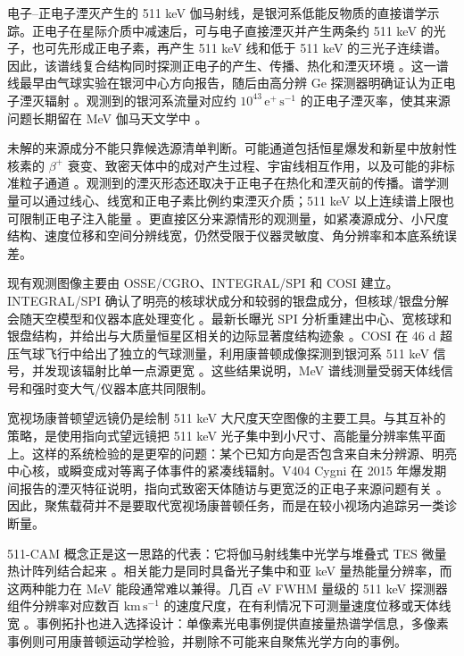 \documentclass[preprint,12pt]{elsarticle}
\begin{document}
电子--正电子湮灭产生的 511 keV 伽马射线，是银河系低能反物质的直接谱学示踪。正电子在星际介质中减速后，可与电子直接湮灭并产生两条约 511 keV 的光子，也可先形成正电子素，再产生 511 keV 线和低于 511 keV 的三光子连续谱。因此，该谱线复合结构同时探测正电子的产生、传播、热化和湮灭环境 \cite{Prantzos2011}。这一谱线最早由气球实验在银河中心方向报告，随后由高分辨 Ge 探测器明确证认为正电子湮灭辐射 \cite{Prantzos2011}。观测到的银河系流量对应约 $10^{43}\,\mathrm{e^+\,s^{-1}}$ 的正电子湮灭率，使其来源问题长期留在 MeV 伽马天文学中 \cite{Prantzos2011,Kierans2020}。

未解的来源成分不能只靠候选源清单判断。可能通道包括恒星爆发和新星中放射性核素的 $\beta^+$ 衰变、致密天体中的成对产生过程、宇宙线相互作用，以及可能的非标准粒子通道 \cite{Prantzos2011,Siegert2016AA,Yoneda2025}。观测到的湮灭形态还取决于正电子在热化和湮灭前的传播。谱学测量可以通过线心、线宽和正电子素比例约束湮灭介质；511 keV 以上连续谱上限也可限制正电子注入能量 \cite{Prantzos2011,Siegert2016AA}。更直接区分来源情形的观测量，如紧凑源成分、小尺度结构、速度位移和空间分辨线宽，仍然受限于仪器灵敏度、角分辨率和本底系统误差。

现有观测图像主要由 OSSE/CGRO、INTEGRAL/SPI 和 COSI 建立。INTEGRAL/SPI 确认了明亮的核球状成分和较弱的银盘成分，但核球/银盘分解会随天空模型和仪器本底处理变化 \cite{Siegert2016AA,Yoneda2025}。最新长曝光 SPI 分析重建出中心、宽核球和银盘结构，并给出与大质量恒星区相关的边际显著度结构迹象 \cite{Yoneda2025}。COSI 在 46 d 超压气球飞行中给出了独立的气球测量，利用康普顿成像探测到银河系 511 keV 信号，并发现该辐射比单一点源更宽 \cite{Kierans2020,Siegert2020COSI}。这些结果说明，MeV 谱线测量受弱天体线信号和强时变大气/仪器本底共同限制。

宽视场康普顿望远镜仍是绘制 511 keV 大尺度天空图像的主要工具。与其互补的策略，是使用指向式望远镜把 511 keV 光子集中到小尺寸、高能量分辨率焦平面上。这样的系统检验的是更窄的问题：某个已知方向是否包含来自未分辨源、明亮中心核，或瞬变成对等离子体事件的紧凑线辐射。V404 Cygni 在 2015 年爆发期间报告的湮灭特征说明，指向式致密天体随访与更宽泛的正电子来源问题有关 \cite{Siegert2016V404}。因此，聚焦载荷并不是要取代宽视场康普顿任务，而是在较小视场内追踪另一类诊断量。

511-CAM 概念正是这一思路的代表：它将伽马射线集中光学与堆叠式 TES 微量热计阵列结合起来 \cite{Shirazi2023}。相关能力是同时具备光子集中和亚 keV 量热能量分辨率，而这两种能力在 MeV 能段通常难以兼得。几百 eV FWHM 量级的 511 keV 探测器组件分辨率对应数百 $\mathrm{km\,s^{-1}}$ 的速度尺度，在有利情况下可测量速度位移或天体线宽 \cite{Shirazi2023}。事例拓扑也进入选择设计：单像素光电事例提供直接量热谱学信息，多像素事例则可用康普顿运动学检验，并剔除不可能来自聚焦光学方向的事例。
\end{document}
